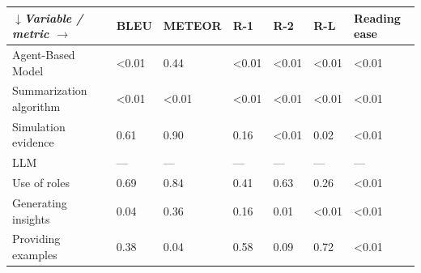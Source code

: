 \begin{tabular}{|l|l|l|l|l|l|l|}
\hline
\textit{$\downarrow$Variable / metric $\rightarrow$} & BLEU & METEOR & R-1 & R-2 & R-L & Reading ease \\
 \hline
 Agent-Based Model & \textless{}0.01 & 0.44 & \textless{}0.01 & \textless{}0.01 & \textless{}0.01 & \textless{}0.01 \\
 \hline
 Summarization algorithm & \textless{}0.01 & \textless{}0.01 & \textless{}0.01 & \textless{}0.01 & \textless{}0.01 & \textless{}0.01 \\
 \hline
 Simulation evidence & 0.61 & 0.90 & 0.16 & \textless{}0.01 & 0.02 & \textless{}0.01 \\
 \hline
 LLM & — & — & — & — & — & — \\
 \hline
 Use of roles & 0.69 & 0.84 & 0.41 & 0.63 & 0.26 & \textless{}0.01 \\
 \hline
 Generating insights & 0.04 & 0.36 & 0.16 & 0.01 & \textless{}0.01 & \textless{}0.01 \\
 \hline
 Providing examples & 0.38 & 0.04 & 0.58 & 0.09 & 0.72 & \textless{}0.01 \\
\hline
\end{tabular}
